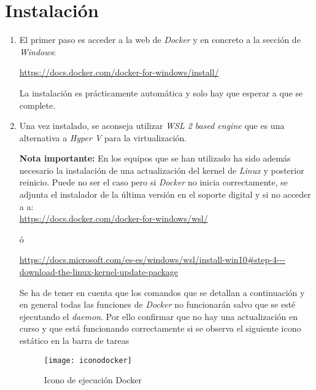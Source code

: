 \section{Instalación} \label{instalaciondeusuario}

\begin{enumerate}
    \item El primer paso es acceder a la web de \emph{Docker} y en concreto a la sección de \emph{Windows}: \\
    
    \begin{center}\url{https://docs.docker.com/docker-for-windows/install/}\end{center}
    
    La instalación es prácticamente automática y solo hay que esperar a que se complete.
    
    \item Una vez instalado, se aconseja utilizar \emph{WSL 2 based engine} que es una alternativa a \emph{Hyper V} para la virtualización.
    
    \textbf{Nota importante:} En los equipos que se han utilizado ha sido además necesario la instalación de una actualización del kernel de \emph{Linux} y posterior reinicio. Puede no ser el caso pero si \emph{Docker} no inicia correctamente, se adjunta el instalador de la última versión en el soporte digital y si no acceder a  a: \\
    
    \url{https://docs.docker.com/docker-for-windows/wsl/}\\
    \begin{center}
    ó\end{center}
    \url{https://docs.microsoft.com/es-es/windows/wsl/install-win10#step-4---download-the-linux-kernel-update-package}
    
    \clearpage
    
    Se ha de tener en cuenta que los comandos que se detallan a continuación y en general todas las funciones de \emph{Docker} no funcionarán salvo que se esté ejecutando el \emph{daemon}. Por ello confirmar que no hay una actualización en curso y que está funcionando correctamente si se observa el siguiente icono estático en la barra de tareas
    
    \begin{figure}[htb]
	\centering
	\texttt{[image: iconodocker]}
	\caption[Icono de ejecución Docker]{Icono de ejecución Docker}
    \end{figure}
    

\end{enumerate}
